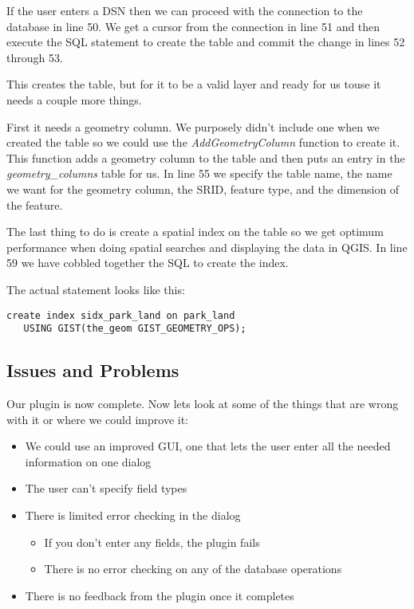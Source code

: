 If the user enters a DSN then we can proceed with the connection to the database in line 50.
We get a cursor from the connection in line 51 and then execute the SQL statement to create the table and commit the change in lines 52 through 53.

This creates the table, but for it to be a valid layer and ready for us touse it needs a couple more things.

First it needs a geometry column.
We purposely didn't include one when we created the table so we could use the \textsl{AddGeometryColumn} function to create it. This function adds a geometry column to the table and then puts an entry in the \textsl{geometry\_columns} table for us.
In line 55 we specify the table name, the name we want for the geometry column, the SRID, feature type, and the dimension of the feature.

The last thing to do is create a spatial index on the table so we get optimum performance when doing spatial searches and displaying the data in QGIS.
In line 59 we have cobbled together the SQL to create the index.

The actual statement looks like this:

\begin{verbatim}
create index sidx_park_land on park_land 
   USING GIST(the_geom GIST_GEOMETRY_OPS);
\end{verbatim}

\subsection{Issues and Problems}

Our plugin is now complete.
Now lets look at some of the things that are wrong with it or where we could improve it:

\begin{itemize}
\item We could use an improved GUI, one that lets the user enter all the needed information on one dialog
\item The user can't specify field types
\item There is limited error checking in the dialog
  \begin{itemize}
    \item If you don't enter any fields, the plugin fails
    \item There is no error checking on any of the database operations
  \end{itemize} 
\item There is no feedback from the plugin once it completes
\end{itemize} 

